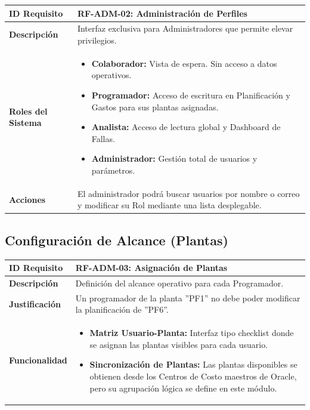 \documentclass[11pt, letterpaper]{article}
\begin{document}
\begin{longtable}{|p{3.5cm}|p{11.5cm}|}
\hline
\rowcolor{headergray} \textbf{ID Requisito} & \textbf{RF-ADM-02: Administración de Perfiles} \\ \hline
\textbf{Descripción} & Interfaz exclusiva para Administradores que permite elevar privilegios. \\ \hline
\textbf{Roles del Sistema} & 
\begin{itemize}
    \item \textbf{Colaborador:} Vista de espera. Sin acceso a datos operativos.
    \item \textbf{Programador:} Acceso de escritura en Planificación y Gastos para sus plantas asignadas.
    \item \textbf{Analista:} Acceso de lectura global y Dashboard de Fallas.
    \item \textbf{Administrador:} Gestión total de usuarios y parámetros.
\end{itemize} \\ \hline
\textbf{Acciones} & El administrador podrá buscar usuarios por nombre o correo y modificar su Rol mediante una lista desplegable. \\ \hline
\end{longtable}

\subsection{Configuración de Alcance (Plantas)}

\begin{longtable}{|p{3.5cm}|p{11.5cm}|}
\hline
\rowcolor{headergray} \textbf{ID Requisito} & \textbf{RF-ADM-03: Asignación de Plantas} \\ \hline
\textbf{Descripción} & Definición del alcance operativo para cada Programador. \\ \hline
\textbf{Justificación} & Un programador de la planta ''PF1'' no debe poder modificar la planificación de ''PF6''. \\ \hline
\textbf{Funcionalidad} & 
\begin{itemize}
    \item \textbf{Matriz Usuario-Planta:} Interfaz tipo checklist donde se asignan las plantas visibles para cada usuario.
    \item \textbf{Sincronización de Plantas:} Las plantas disponibles se obtienen desde los Centros de Costo maestros de Oracle, pero su agrupación lógica se define en este módulo.
\end{itemize} \\ \hline
\end{longtable}
\end{document}
